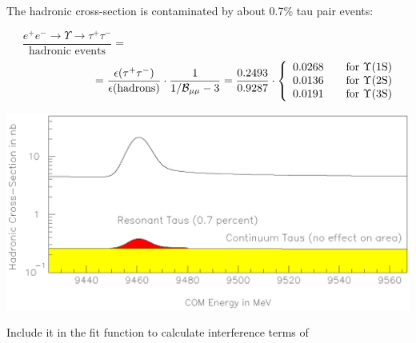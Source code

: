 
\begin{slide*}

\slideframe{}
\huge
{}

\begin{minipage}[t]{\linewidth}
\large

The hadronic cross-section is contaminated by about 0.7\% tau pair events:

\[
\frac{e^+ e^- \to \Upsilon \to \tau^+ \tau^-}{\mbox{hadronic events}} = \hspace{10cm}
\]
\vspace{-1cm}
\[
\hspace{2.5cm} =
\frac{\epsilon(\tau^+ \tau^-)}{\epsilon(\mbox{hadrons})} \cdot
\frac{1}{1/{\mathcal B}_{\mu\mu} - 3} =
\frac{0.2493}{0.9287} \cdot \left\{ \begin{array}{c c c}
0.0268 & & \mbox{for } \Upsilon(\mbox{1S}) \\
0.0136 & & \mbox{for } \Upsilon(\mbox{2S}) \\
0.0191 & & \mbox{for } \Upsilon(\mbox{3S}) \\
\end{array} \right.
\]

\vspace{-1cm}

\begin{center}
  \includegraphics[width=\linewidth]{plot_taus.eps}
\end{center}

\vspace{-0.5cm}

Include it in the fit function to calculate interference terms of


\end{minipage}
\end{slide*}
